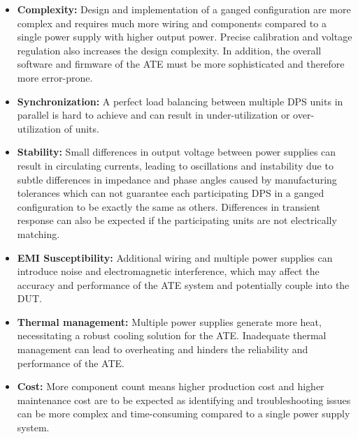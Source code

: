 \begin{itemize}[topsep=8pt,itemsep=4pt,partopsep=4pt, parsep=4pt]
    \item \textbf{Complexity:}
    Design and implementation of a ganged configuration are more complex
    and requires much more wiring and components compared to a single power
    supply with higher output power.
    Precise calibration and voltage regulation also increases the design
    complexity.
    In addition, the overall software and firmware of the \ac{ATE} must
    be more sophisticated and therefore more error-prone.

    \item \textbf{Synchronization:}
    A perfect load balancing between multiple \ac{DPS} units in parallel is hard
    to achieve and can result in under-utilization or over-utilization of units.

    \item \textbf{Stability:}
    Small differences in output voltage between power supplies can result in
    circulating currents, leading to oscillations and instability
    due to subtle differences in impedance and phase angles caused by
    manufacturing tolerances which can not guarantee each participating
    \ac{DPS} in a ganged configuration to be exactly the same as others.
    Differences in transient response can also be expected if the participating
    units are not electrically matching.

    \item \textbf{\acs{EMI} Susceptibility:}
    Additional wiring and multiple power supplies can introduce noise and
    electromagnetic interference, which may affect the accuracy and
    performance of the ATE system and potentially couple into the \ac{DUT}.

    \item \textbf{Thermal management:}
    Multiple power supplies generate more heat, necessitating a robust
    cooling solution for the \ac{ATE}.
    Inadequate thermal management can lead to overheating and hinders the
    reliability and performance of the \ac{ATE}.

    \item \textbf{Cost:}
    More component count means higher production cost and higher maintenance
    cost are to be expected as identifying and troubleshooting issues can be
    more complex and time-consuming compared to a single power supply system.

\end{itemize}

